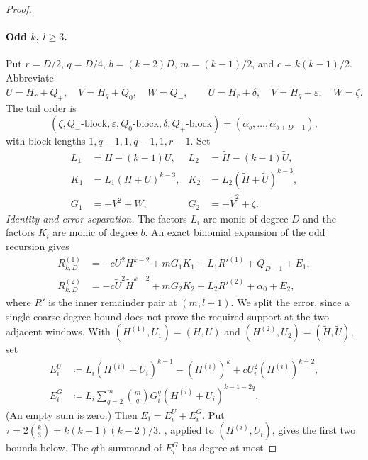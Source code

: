 \begin{proof}
      \paragraph{Odd $k$, $l\ge3$.}
      Put $r=D/2$, $q=D/4$, $b=(k-2)D$, $m=(k-1)/2$, and
      $c=k(k-1)/2$.
      Abbreviate
      \[
        U=H_r+Q_+,\quad V=H_q+Q_0,\quad W=Q_-,
        \qquad
        \widetilde U=H_r+\delta,\quad
        \widetilde V=H_q+\varepsilon,\quad
        \widetilde W=\zeta.
      \]
      The tail order is
      \[
        (\zeta,Q_-\text{-block},\varepsilon,Q_0\text{-block},
          \delta,Q_+\text{-block})
        =(\alpha_{b},\ldots,\alpha_{b+D-1}),
        \tag{R-odd-block}
      \]
      with block lengths $1,q-1,1,q-1,1,r-1$.  Set
      \[
      \begin{aligned}
        L_1&=H-(k-1)U,&
        L_2&=\widetilde H-(k-1)\widetilde U,\\
        K_1&=L_1(H+U)^{k-3},&
        K_2&=L_2(\widetilde H+\widetilde U)^{k-3},\\
        G_1&=-V^2+W,&
        G_2&=-\widetilde V^2+\zeta.
      \end{aligned}
      \]
      \smallskip\noindent\emph{Identity and error separation.}
      The factors $L_i$ are monic of degree $D$ and the factors $K_i$ are
      monic of degree $b$.  An exact binomial expansion
      of the odd recursion gives
      \begin{align}
        R^{(1)}_{k,D}&=-cU^2H^{k-2}+mG_1K_1
             +L_1R'^{(1)}+Q_{D-1}+E_1,\\
        R^{(2)}_{k,D}&=-c\widetilde U^2\widetilde H^{k-2}+mG_2K_2
             +L_2R'^{(2)}+\alpha_0+E_2,
        \tag{R-odd-block-exp}
      \end{align}
      where $R'$ is the inner remainder pair at $(m,l+1)$.  We split the
      error, since a single coarse degree bound does not prove the required
      support at the two adjacent windows.  With
      $(H^{(1)},U_1)=(H,U)$ and $(H^{(2)},U_2)=(\widetilde H,\widetilde U)$, set
      \[
      \begin{aligned}
      E_i^{U}&\coloneqq
        L_i(H^{(i)}+U_i)^{k-1}-(H^{(i)})^k+cU_i^2(H^{(i)})^{k-2},\\
      E_i^{G}&\coloneqq
        L_i\sum_{q=2}^{m}\binom mqG_i^q
                       (H^{(i)}+U_i)^{k-1-2q}.
      \end{aligned}
      \]
      (An empty sum is zero.)  Then $E_i=E_i^U+E_i^G$.  Put
      $\tau=2\binom{k}{3}=k(k-1)(k-2)/3$.
      , applied to $(H^{(i)},U_i)$, gives the first
      two bounds below.  The $q$th summand of $E_i^G$ has degree at most


\end{proof}
